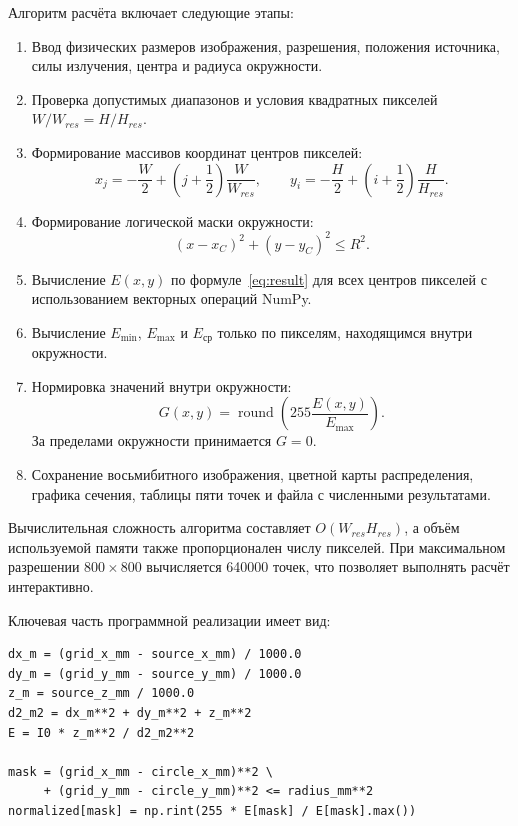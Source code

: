 \documentclass[a4paper,12pt]{article}
\begin{document}
Алгоритм расчёта включает следующие этапы:
\begin{enumerate}
  \item Ввод физических размеров изображения, разрешения, положения
        источника, силы излучения, центра и радиуса окружности.
  \item Проверка допустимых диапазонов и условия квадратных пикселей
        $W/W_{res}=H/H_{res}$.
  \item Формирование массивов координат центров пикселей:
  \begin{equation}
    x_j=-\frac{W}{2}+\left(j+\frac12\right)\frac{W}{W_{res}},
    \qquad
    y_i=-\frac{H}{2}+\left(i+\frac12\right)\frac{H}{H_{res}}.
  \end{equation}
  \item Формирование логической маски окружности:
  \begin{equation}
    (x-x_C)^2+(y-y_C)^2\le R^2.
  \end{equation}
  \item Вычисление $E(x,y)$ по формуле~\eqref{eq:result} для всех центров
        пикселей с использованием векторных операций NumPy.
  \item Вычисление $E_{\min}$, $E_{\max}$ и $E_{\text{ср}}$ только по
        пикселям, находящимся внутри окружности.
  \item Нормировка значений внутри окружности:
  \begin{equation}
    G(x,y)=\operatorname{round}\left(255\frac{E(x,y)}{E_{\max}}\right).
  \end{equation}
        За пределами окружности принимается $G=0$.
  \item Сохранение восьмибитного изображения, цветной карты распределения,
        графика сечения, таблицы пяти точек и файла с численными результатами.
\end{enumerate}

Вычислительная сложность алгоритма составляет
$O(W_{res}H_{res})$, а объём используемой памяти также пропорционален числу
пикселей. При максимальном разрешении $800\times800$ вычисляется 640000 точек,
что позволяет выполнять расчёт интерактивно.

Ключевая часть программной реализации имеет вид:
\begin{lstlisting}[caption={Вычисление распределения и нормировка}]
dx_m = (grid_x_mm - source_x_mm) / 1000.0
dy_m = (grid_y_mm - source_y_mm) / 1000.0
z_m = source_z_mm / 1000.0
d2_m2 = dx_m**2 + dy_m**2 + z_m**2
E = I0 * z_m**2 / d2_m2**2

mask = (grid_x_mm - circle_x_mm)**2 \
     + (grid_y_mm - circle_y_mm)**2 <= radius_mm**2
normalized[mask] = np.rint(255 * E[mask] / E[mask].max())
\end{lstlisting}
\end{document}
